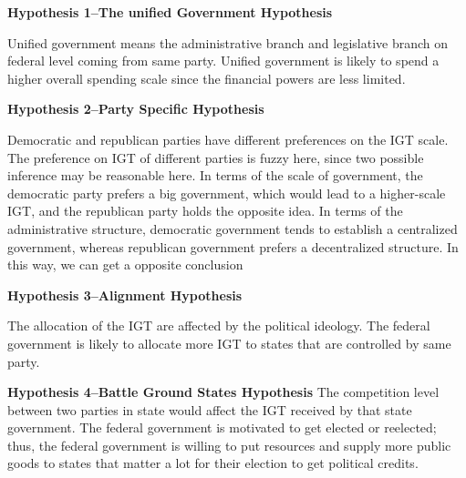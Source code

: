 \textbf{Hypothesis 1–The unified Government Hypothesis}

Unified government means the administrative branch and legislative branch on federal level coming from same party. Unified government is likely to spend a higher overall spending scale since the financial powers are less limited.

\textbf{Hypothesis 2–Party Specific Hypothesis}

Democratic and republican parties have different preferences on the IGT scale. The preference on IGT of different parties is fuzzy here, since two possible inference may be reasonable here. In terms of the scale of government, the democratic party prefers a big government, which would lead to a higher-scale IGT, and the republican party holds the opposite idea. In terms of the administrative structure, democratic government tends to establish a centralized government, whereas republican government prefers a decentralized structure. In this way, we can get a opposite conclusion

\textbf{Hypothesis 3–Alignment Hypothesis}

The allocation of the IGT are affected by the political ideology. The federal government is likely to allocate more IGT to states that are controlled by same party.

\textbf{Hypothesis 4–Battle Ground States Hypothesis}
The competition level between two parties in state would affect the IGT received by that state government. The federal government is motivated to get elected or reelected; thus, the federal government is willing to put resources and supply more public goods to states that matter a lot for their election to get political credits.




